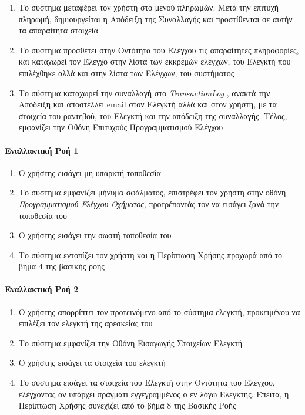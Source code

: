 \documentclass{../ol-softwaremanual}
\begin{document}
\begin{enumerate}
		\item Το σύστημα μεταφέρει τον χρήστη στο μενού πληρωμών. Μετά την επιτυχή πληρωμή, δημιουργείται η Απόδειξη της Συναλλαγής και προστίθενται σε αυτήν τα απαραίτητα στοιχεία
		\item Το σύστημα προσθέτει στην Οντότητα του Ελέγχου τις απαραίτητες πληροφορίες, και καταχωρεί τον Έλεγχο στην λίστα των εκκρεμών ελέγχων, του Ελεγκτή που επιλέχθηκε αλλά και στην λίστα των Ελέγχων, του συστήματος
		\item Το σύστημα καταχωρεί την συναλλαγή στο \en \textit{TransactionLog} \gr, ανακτά την Απόδειξη και αποστέλλει \en email \gr στον Ελεγκτή αλλά και στον χρήστη, με τα στοιχεία του ραντεβού, του Ελεγκτή και την απόδειξη της συναλλαγής. Τέλος, εμφανίζει την Οθόνη Επιτυχούς Προγραμματισμού Ελέγχου
	\end{enumerate}



	\paragraph{Εναλλακτική Ροή 1}

	\begin{enumerate}
		\item Ο χρήστης εισάγει μη-υπαρκτή τοποθεσία
		\item Το σύστημα εμφανίζει μήνυμα σφάλματος, επιστρέφει τον χρήστη στην οθόνη \textit{Προγραμματισμού Ελέγχου Οχήματος}, προτρέποντάς τον να εισάγει ξανά την τοποθεσία του
		\item Ο χρήστης εισάγει την σωστή τοποθεσία του
		\item Το σύστημα εντοπίζει τον χρήστη και η Περίπτωση Χρήσης προχωρά από το βήμα 4 της βασικής ροής
	\end{enumerate}

	\paragraph{Εναλλακτική Ροή 2}

	\begin{enumerate}
		\item Ο χρήστης απορρίπτει τον προτεινόμενο από το σύστημα ελεγκτή, προκειμένου να επιλέξει τον ελεγκτή της αρεσκείας του
		\item Το σύστημα εμφανίζει την Οθόνη Εισαγωγής Στοιχείων Ελεγκτή
		\item Ο χρήστης εισάγει τα στοιχεία του ελεγκτή
		\item Το σύστημα εισάγει τα στοιχεία του Ελεγκτή στην Οντότητα του Ελέγχου, ελέγχοντας αν υπάρχει πράγματι εγγεγραμμένος ο εν λόγω Ελεγκτής. Έπειτα, η Περίπτωση Χρήσης συνεχίζει από το βήμα 8 της Βασικής Ροής
	\end{enumerate}	
\end{document}
